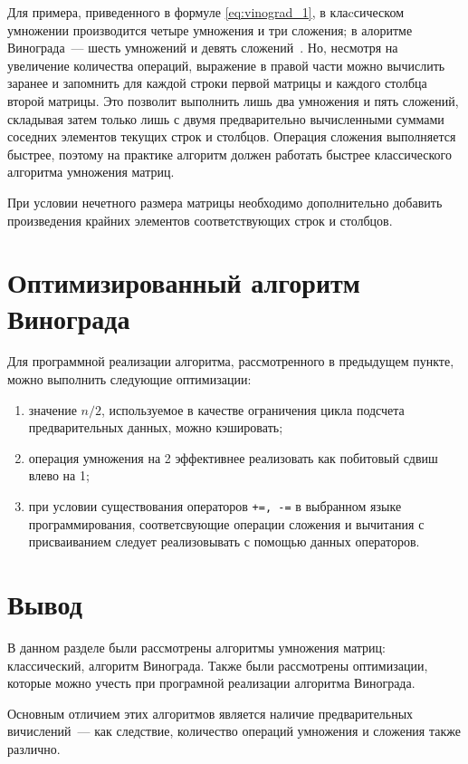 Для примера, приведенного в формуле \ref{eq:vinograd_1}, в клаcсическом умножении производится четыре умножения и три сложения; в алоритме Винограда~--- шесть умножений и девять сложений~\cite{vinograd-alg}. Но, несмотря на увеличение количества операций, 
выражение в правой части можно вычислить заранее и запомнить для каждой строки первой матрицы и каждого столбца второй матрицы.
Это позволит выполнить лишь два умножения и пять сложений, складывая затем только лишь с двумя предварительно вычисленными суммами соседних элементов текущих строк и столбцов. Операция сложения выполняется быстрее, поэтому на практике алгоритм должен работать
быстрее классического алгоритма умножения матриц.

При условии нечетного размера матрицы необходимо дополнительно добавить произведения крайних элементов соответствующих строк и столбцов.

\section{Оптимизированный алгоритм Винограда}
Для программной реализации алгоритма, рассмотренного в предыдущем пункте, можно выполнить следующие оптимизации:
\begin{enumerate}
    \item значение $n / 2$, используемое в качестве ограничения цикла подсчета предварительных данных, можно кэшировать;
    \item операция умножения на 2 эффективнее реализовать как побитовый сдвиш влево на 1;
    \item при условии существования операторов \texttt{+=, -=} в выбранном языке программирования, соответсвующие операции сложения и вычитания с присваиванием следует реализовывать с помощью данных операторов.
\end{enumerate}

\section*{Вывод}
В данном разделе были рассмотрены алгоритмы умножения матриц: классический, алгоритм Винограда. Также были рассмотрены оптимизации, которые можно учесть при програмной реализации алгоритма Винограда.

Основным отличием этих алгоритмов является наличие предварительных вичислений~--- как следствие, количество операций умножения и сложения также различно.